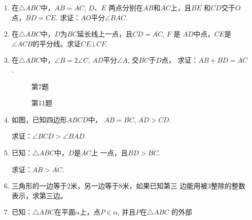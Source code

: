 \begin{enumerate}
\item 在$\triangle ABC$中，$\overline{AB}=\overline{AC}$, $D$、$E$
两点分别在$\overline{AB}$和$\overline{AC}$上，且$\overline{BE}$
和$\overline{CD}$交于$O$点，$\overline{BD}=\overline{CE}$. 求证：$AO$平分$\angle BAC$.
\item 在$\triangle ABC$中，$D$为$\overline{BC}$延长线上一点，且$\overline{CD}=\overline{AC}$, $F$
是
$\overline{AD}$中点，$\overline{CE}$是$\angle ACB$的平分线。求证$CE\bot CF$.

\item 在$\triangle ABC$中，$\angle B=2\angle C$, $AD$平分$\angle A$, 交$\overline{BC}$于$D$点，
求证：$\overline{AB}+\overline{BD}=\overline{AC}$.

\begin{figure}[htp]\centering
    \begin{minipage}[t]{0.48\textwidth}
    \centering
{}
    \caption*{第7题}
    \end{minipage}
    \begin{minipage}[t]{0.48\textwidth}
    \centering
    \caption*{第11题}
    \end{minipage}
    \end{figure}

\item 如图，已知四边形$ABCD$中，
$\overline{AB}=\overline{BC}$, $\overline{AD}>\overline{CD}$. 

求证：$\angle BCD>\angle BAD$.
\item 已知：$\triangle ABC$中，$D$是$\overline{AC}$上
一点，且$\overline{BD}>\overline{BC}$. 

求证：$\overline{AB}>\overline{AC}$.
\item 三角形的一边等于2米，另一边等于8米，如果已知第三
边能用被3整除的整数表示，求第三边。
\item 已知：$\triangle ABC$在平面$\alpha$上，点$P\in\alpha$, 并且$P$在$\triangle ABC$
的外部


\end{enumerate}

